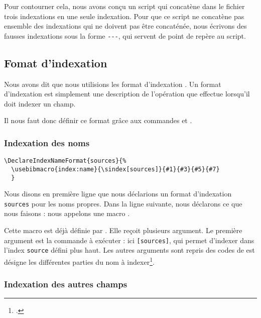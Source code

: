 {\begin{description}
Pour contourner cela, nous avons conçu un script qui concatène dans le fichier  trois indexations en une seule indexation. Pour que ce script ne concatène pas ensemble des indexations qui ne doivent pas être concaténée, nous écrivons des fausses indexations sous la forme \verb|---|, qui servent de point de repère au script.
\end{description}

\subsection{Fomat d'indexation }

Nous avons dit que nous utilisions les format d'indexation . Un format d'indexation   est simplement une description de l'opération que  effectue lorsqu'il doit indexer un champ. 

Il nous faut donc définir ce format grâce aux commandes  et \csp{\DeclareIndexFieldFormat}.

\subsubsection{Indexation des noms}

\begin{english}
\begin{verbatim}
\DeclareIndexNameFormat{sources}{%
  \usebibmacro{index:name}{\sindex[sources]}{#1}{#3}{#5}{#7}
  }
\end{verbatim}
\end{english}

Nous disons en première ligne que nous déclarions un format d'indexation \verb|sources| pour les noms propres. Dans la ligne suivante, nous déclarons ce que nous faisons : nous appelons une macro . 

Cette macro est déjà définie par . Elle reçoit plusieurs argument. Le première argument est la commande à exécuter : ici \verb|[sources]|, qui permet d'indexer dans l'index \verb|source| défini plus haut. Les autres arguments sont repris des codes de  est désigne les différentes parties du nom à indexer\footcite[Nous renvoyons le lecteur à la documentation de  : ][]{biblatex_formats}.


\subsubsection{Indexation des autres champs}

}
